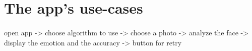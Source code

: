\documentclass[a4paper,12pt]{article}
\begin{document}
    \section*{The app's use-cases}

    \paragraph{}
    open app -\textgreater\textvisiblespace
    choose algorithm to use -\textgreater\textvisiblespace
    choose a photo -\textgreater\textvisiblespace
    analyze the face -\textgreater\textvisiblespace
    display the emotion and the accuracy -\textgreater\textvisiblespace
    button for retry

    \begin{thebibliography}{9}
        
    \end{thebibliography}
\end{document}
